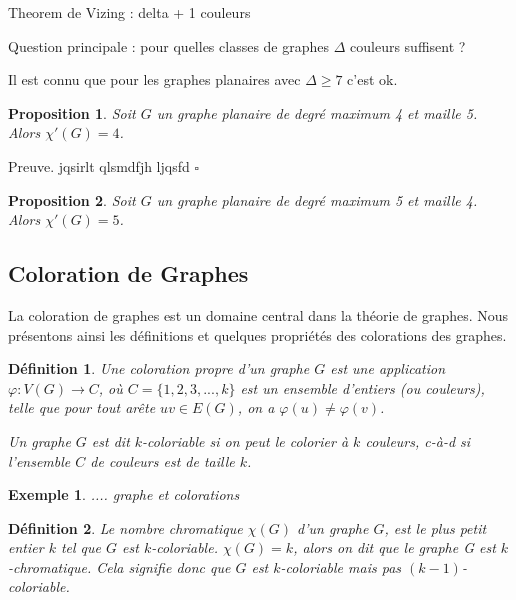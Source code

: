 \documentclass[10pt,a4paper]{article}
\newtheorem{definition}{Définition}
\newtheorem{proposition}{Proposition}
\newtheorem{exemple}{Exemple}
\newcommand{\ep}{{\hfill $\square$}}
\begin{document}
Theorem de Vizing : delta + 1 couleurs 

Question principale : pour quelles classes de graphes $\Delta$ couleurs suffisent ?

Il est connu que pour les graphes planaires avec $\Delta\ge 7$ c'est ok.

\begin{proposition}
Soit $G$ un graphe planaire de degré maximum 4 et maille 5. Alors $\chi'(G)=4$.
\end{proposition}

Preuve. jqsirlt qlsmdfjh ljqsfd \ep

\begin{proposition}
Soit $G$ un graphe planaire de degré maximum 5 et maille 4. Alors $\chi'(G)=5$.
\end{proposition}


\subsection{Coloration de Graphes}
La coloration de graphes est un domaine central dans la théorie de graphes. 
Nous présentons ainsi les définitions et quelques propriétés des colorations des graphes.


\begin{definition}%
Une \emph{coloration propre} d'un graphe $G$ est une application $\varphi: V(G) \to C$, où $C=\{1,2,3,...,k\}$ est un ensemble d'entiers (ou \emph{couleurs}), telle que pour tout arête $uv \in E(G)$, on a $\varphi(u) \neq \varphi(v)$.

Un graphe $G$ est dit $k$-coloriable si on peut le colorier à $k$ couleurs, c-à-d si l'ensemble $C$ de couleurs est de taille $k$.
\end{definition}

\begin{exemple}
.... graphe et colorations
\end{exemple}

\begin{definition}%
Le \emph{nombre chromatique} $\chi(G)$ d'un graphe $G$, est le plus petit entier $k$ tel que $G$ est $k$-coloriable. $\chi(G) = k$, alors on dit que le graphe G est \emph{$k$-chromatique}. Cela signifie donc que $G$ est $k$-coloriable mais  pas $(k-1)$-coloriable.
\end{definition}
\end{document}
